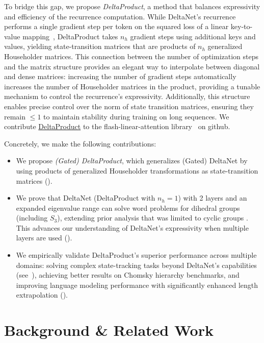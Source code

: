 \documentclass{article} %
\begin{document}
To bridge this gap, we propose \textit{DeltaProduct}, a method that balances expressivity and efficiency of the recurrence computation. 
While DeltaNet's recurrence performs a single gradient step per token on the squared loss of a linear key-to-value mapping~\citep{wang2025test,yang-neurips24a}, DeltaProduct takes $n_h$ gradient steps using additional keys and values, yielding state-transition matrices that are products of $n_h$ generalized Householder matrices.
This connection between the number of optimization steps and the matrix structure provides an elegant way to interpolate between diagonal and dense matrices: increasing the number of gradient steps automatically increases the number of Householder matrices in the product, providing a tunable mechanism to control the recurrence's expressivity. Additionally, this structure enables precise control over the norm of state transition matrices, ensuring they remain $\leq1$ to maintain stability during training on long sequences. We contribute \href{https://github.com/fla-org/flash-linear-attention/blob/main/fla/layers/gated_deltaproduct.py}{DeltaProduct} to the flash-linear-attention library~\citep{yang2024fla} on github.

Concretely, we make the following contributions:
\begin{itemize}[leftmargin=8mm]
    \item We propose \textit{(Gated) DeltaProduct}, which generalizes (Gated) DeltaNet by using products of generalized Householder transformations as state-transition matrices (). 
    \item We prove that DeltaNet (DeltaProduct with $n_h=1$) with 2 layers and an expanded eigenvalue range can solve word problems for dihedral groups (including $S_3$), extending prior analysis that was limited to cyclic groups \citep[Theorem 6]{grazzi-iclr25a}. This advances our understanding of DeltaNet's expressivity when multiple layers are used ().
    \item We empirically validate DeltaProduct's superior performance across multiple domains: solving complex state-tracking tasks beyond DeltaNet's capabilities (see~), achieving better results on Chomsky hierarchy benchmarks, and improving language modeling performance with significantly enhanced length extrapolation ().
\end{itemize}


\section{Background \& Related Work}
\end{document}
